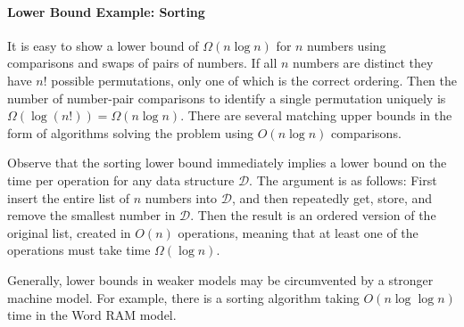 \begin{leftbar}
    \vspace{-1.4em} \paragraph{Lower Bound Example: Sorting}
    It is easy to show a lower bound of $\Omega(n \log n)$ for  $n$ numbers using comparisons and swaps of pairs of numbers. If all $n$ numbers are distinct they have $n!$ possible permutations, only one of which is the correct ordering. Then the number of number-pair comparisons to identify a single permutation uniquely is $\Omega(\log (n!)) = \Omega(n \log n)$. There are several matching upper bounds in the form of algorithms solving the problem using $O(n \log n)$ comparisons.

    Observe that the sorting lower bound immediately implies a lower bound on the time per operation for any  data structure $\mathcal{D}$. The argument is as follows: First insert the entire list of $n$ numbers into $\mathcal{D}$, and then repeatedly get, store, and remove the smallest number in $\mathcal{D}$. Then the result is an ordered version of the original list, created in $O(n)$ operations, meaning that at least one of the operations must take time $\Omega(\log n)$.

    Generally, lower bounds in weaker models may be circumvented by a stronger machine model. For example, there is a sorting algorithm taking $O(n \log \log n)$ time in the Word RAM model.
\end{leftbar}

